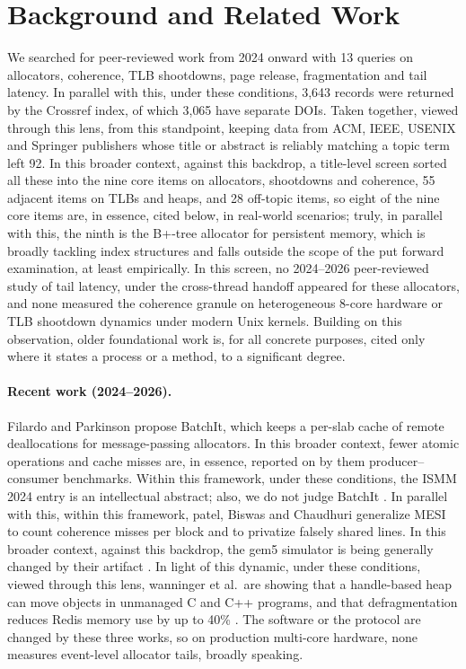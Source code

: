 \section{Background and Related Work}
\label{sec:background}
We searched for peer-reviewed work from 2024 onward with 13 queries on allocators, coherence, TLB shootdowns,
page release, fragmentation and tail latency. In parallel with this, under these conditions, 3{,}643 records were returned by the Crossref index, of which 3{,}065 have
separate DOIs. Taken together, viewed through this lens, from this standpoint, keeping data from ACM, IEEE, USENIX and Springer publishers whose title or abstract is reliably matching a topic
term left 92. In this broader context, against this backdrop, a title-level screen sorted all these into the nine core items on allocators, shootdowns and coherence, 55
adjacent items on TLBs and heaps, and 28 off-topic items, so eight of the nine core items are, in essence, cited below, in real-world scenarios; truly, in parallel with this, the ninth is
the B+-tree allocator for persistent memory, which is broadly tackling index structures and falls outside the scope of the put forward examination, at least empirically.
In this screen, no 2024--2026 peer-reviewed study of tail latency, under the cross-thread handoff appeared for these
allocators, and none measured the coherence granule on heterogeneous 8-core hardware or TLB shootdown dynamics under modern Unix kernels. Building on this observation, older
foundational work is, for all concrete purposes, cited only where it states a process or a method, to a significant degree.

\paragraph{Recent work (2024--2026).} Filardo and Parkinson propose BatchIt, which keeps a per-slab cache of
remote deallocations for message-passing allocators. In this broader context, fewer atomic operations and cache misses are, in essence, reported on by them
producer--consumer benchmarks. Within this framework, under these conditions, the ISMM 2024 entry is an intellectual abstract; also, we do not judge BatchIt
\cite{filardo2024batchit}. In parallel with this, within this framework, patel, Biswas and Chaudhuri generalize MESI to count coherence misses per block and to
privatize falsely shared lines. In this broader context, against this backdrop, the gem5 simulator is being generally changed by their artifact
\cite{patel2024fsdetect}. In light of this dynamic, under these conditions, viewed through this lens, wanninger et al.\ are showing that a handle-based heap can move objects in unmanaged
C and C++ programs, and that defragmentation reduces Redis memory use by up to 40\% \cite{wanninger2024alaska}.
The software or the protocol are changed by these three works, so on production multi-core hardware, none measures event-level allocator tails, broadly speaking.

